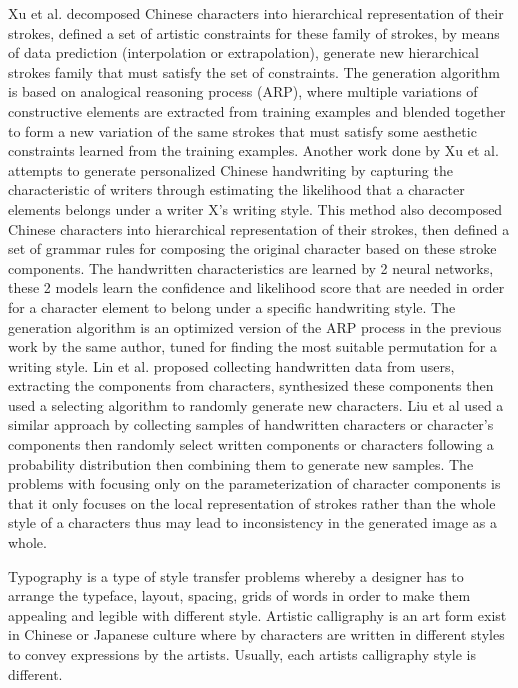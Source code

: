 \documentclass[12pt]{report}
\begin{document}
Xu et al.\cite{automatic-calligraphy} decomposed Chinese characters into hierarchical representation of their
strokes, defined a set of artistic constraints for these family of strokes, by means of
data prediction (interpolation or extrapolation), generate new hierarchical strokes
family that must satisfy the set of constraints. The generation algorithm is based on
analogical reasoning process (ARP), where multiple variations of constructive
elements are extracted from training examples and blended together to form a new
variation of the same strokes that must satisfy some aesthetic constraints learned
from the training examples.
Another work done by Xu et al.\cite{automatic-handwritten} attempts to generate personalized Chinese
handwriting by capturing the characteristic of writers through estimating the
likelihood that a character elements belongs under a writer X’s writing style. This
method also decomposed Chinese characters into hierarchical representation of their
strokes, then defined a set of grammar rules for composing the original character
based on these stroke components. The handwritten characteristics are learned by 2
neural networks, these 2 models learn the confidence and likelihood score that are
needed in order for a character element to belong under a specific handwriting style.
The generation algorithm is an optimized version of the ARP process in the previous
work by the same author, tuned for finding the most suitable permutation for a
writing style.
Lin et al.\cite{handwritten-font} proposed collecting handwritten data from users, extracting the
components from characters, synthesized these components then used a selecting
algorithm to randomly generate new characters.
Liu et al\cite{automatic-personalized} used a similar approach by collecting samples of handwritten characters
or character’s components then randomly select written components or characters
following a probability distribution then combining them to generate new samples.
The problems with focusing only on the parameterization of character components
is that it only focuses on the local representation of strokes rather than the whole
style of a characters thus may lead to inconsistency in the generated image as a whole.

Typography is a type of style transfer problems whereby a designer has to arrange the typeface, layout, spacing, grids of words in order to make them appealing and legible with different style. Artistic calligraphy is an art form exist in Chinese or Japanese culture where by characters are written in different styles to convey expressions by the artists. Usually, each artists calligraphy style is different.
\end{document}
